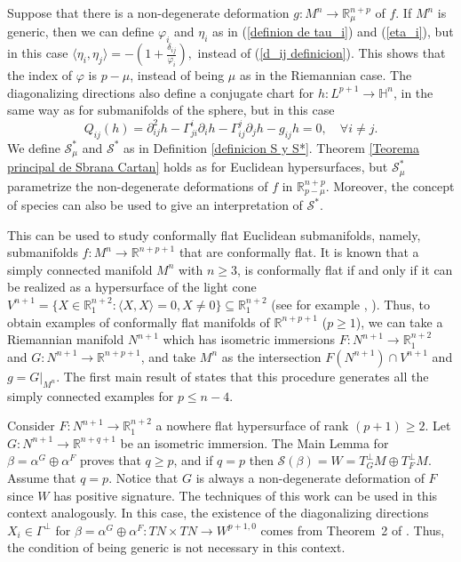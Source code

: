 \documentclass{article}
\theoremstyle{remark}
\begin{document}
Suppose that there is a non-degenerate deformation $g:M^n\rightarrow\mathbb{R}^{n+p}_{\mu}$ of $f$. If $M^n$ is generic, then we can define $\varphi_i$ and $\eta_i$ as in (\ref{definion de tau_i}) and (\ref{eta_i}), but in this case $\langle \eta_i,\eta_j\rangle=-(1+\frac{\delta_{ij}}{\varphi_i}),$
instead of (\ref{d_ij definicion}). This shows that the index of $\varphi$ is $p-\mu$, instead of being $\mu$ as in the Riemannian case. The diagonalizing directions also define a conjugate chart for $h:L^{p+1}\rightarrow\mathbb{H}^n$, in the same way as for submanifolds of the sphere, but in this case 
\begin{equation*}\label{Q_ij Lorentz}
    Q_{ij}(h)=\partial_{ij}^2h-\Gamma_{ji}^i\partial_ih-\Gamma_{ij}^j\partial_jh-g_{ij}h=0,\quad\forall i\neq j.
\end{equation*} 
We define $\mathcal{S}_{\mu}^{*}$ and $\mathcal{S}^{*}$ as in Definition \ref{definicion S y S*}. Theorem \ref{Teorema principal de Sbrana Cartan} holds as for Euclidean hypersurfaces, but $\mathcal{S}_{\mu}^{*}$ parametrize the non-degenerate deformations of $f$ in $\mathbb{R}^{n+p}_{p-\mu}$. Moreover, the concept of species can also be used to give an interpretation of $\mathcal{S}^{*}$.

This can be used to study conformally flat Euclidean submanifolds, namely, submanifolds $f:M^n\rightarrow\mathbb{R}^{n+p+1}$ that are conformally flat. It is known that a simply connected manifold $M^n$ with $n\geq 3$, is conformally flat if and only if it can be realized as a hypersurface of the light cone $V^{n+1}=\{X\in\mathbb{R}_1^{n+2}:\langle X,X\rangle=0, X\neq 0\}\subseteq\mathbb{R}_1^{n+2}$ (see for example \cite{AD}, \cite{DF2}). Thus, to obtain examples of conformally flat manifolds of $\mathbb{R}^{n+p+1}$ ($p\geq 1$), we can take a Riemannian manifold $N^{n+1}$ which has isometric immersions $F:N^{n+1}\rightarrow\mathbb{R}_1^{n+2}$ and $G:N^{n+1}\rightarrow\mathbb{R}^{n+p+1}$, and take $M^n$ as the intersection $F(N^{n+1})\cap V^{n+1}$ and $g=G|_{M^n}$. The first main result of \cite{DF2} states that this procedure generates all the simply connected examples for $p\leq n-4$. 

Consider $F:N^{n+1}\rightarrow\mathbb{R}_1^{n+2}$ a nowhere flat hypersurface of rank $(p+1)\geq 2$. Let $G:N^{n+1}\rightarrow\mathbb{R}^{n+q+1}$ be an isometric immersion. The Main Lemma for $\beta=\alpha^G\oplus\alpha^F$ proves that $q\geq p$, and if $q=p$ then $\mathcal{S}(\beta)=W=T^{\perp}_GM\oplus T^{\perp}_FM$. Assume that $q=p$. Notice that $G$ is always a non-degenerate deformation of $F$ since $W$ has positive signature. The techniques of this work can be used in this context analogously. In this case, the existence of the diagonalizing directions $X_i\in\Gamma^\perp$ for $\beta=\alpha^G\oplus\alpha^F:TN\times TN\rightarrow W^{p+1,0}$ comes from Theorem~2 of \cite{Moo}. Thus, the condition of being generic is not necessary in this context.
\end{document}
